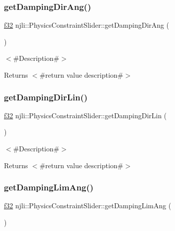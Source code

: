 \subsubsection{\texorpdfstring{get\+Damping\+Dir\+Ang()}{getDampingDirAng()}}
{\footnotesize\ttfamily \mbox{\hyperlink{_util_8h_a5f6906312a689f27d70e9d086649d3fd}{f32}} njli\+::\+Physics\+Constraint\+Slider\+::get\+Damping\+Dir\+Ang (\begin{DoxyParamCaption}{ }\end{DoxyParamCaption})}

$<$\#\+Description\#$>$

\begin{DoxyReturn}{Returns}
$<$\#return value description\#$>$ 
\end{DoxyReturn}
\mbox{\label{classnjli_1_1_physics_constraint_slider_a732ef9c25c7b514691e56e1bc73e5aa4}} 
\subsubsection{\texorpdfstring{get\+Damping\+Dir\+Lin()}{getDampingDirLin()}}
{\footnotesize\ttfamily \mbox{\hyperlink{_util_8h_a5f6906312a689f27d70e9d086649d3fd}{f32}} njli\+::\+Physics\+Constraint\+Slider\+::get\+Damping\+Dir\+Lin (\begin{DoxyParamCaption}{ }\end{DoxyParamCaption})}

$<$\#\+Description\#$>$

\begin{DoxyReturn}{Returns}
$<$\#return value description\#$>$ 
\end{DoxyReturn}
\mbox{\label{classnjli_1_1_physics_constraint_slider_a6e763888cee48794371c15a6fd811925}} 
\subsubsection{\texorpdfstring{get\+Damping\+Lim\+Ang()}{getDampingLimAng()}}
{\footnotesize\ttfamily \mbox{\hyperlink{_util_8h_a5f6906312a689f27d70e9d086649d3fd}{f32}} njli\+::\+Physics\+Constraint\+Slider\+::get\+Damping\+Lim\+Ang (\begin{DoxyParamCaption}{ }\end{DoxyParamCaption})}

